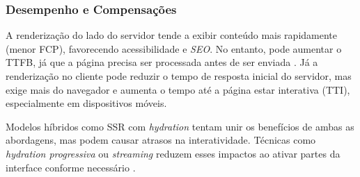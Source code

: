 
    






\subsubsection{Desempenho e Compensações}

A renderização do lado do servidor tende a exibir conteúdo mais rapidamente (menor FCP), favorecendo acessibilidade e \textit{SEO}. No entanto, pode aumentar o TTFB, já que a página precisa ser processada antes de ser enviada \cite{osmani2025}. Já a renderização no cliente pode reduzir o tempo de resposta inicial do servidor, mas exige mais do navegador e aumenta o tempo até a página estar interativa (TTI), especialmente em dispositivos móveis.

Modelos híbridos como SSR com \textit{hydration} tentam unir os benefícios de ambas as abordagens, mas podem causar atrasos na interatividade. Técnicas como \textit{hydration progressiva} ou \textit{streaming} reduzem esses impactos ao ativar partes da interface conforme necessário \cite{osmani2025}.


